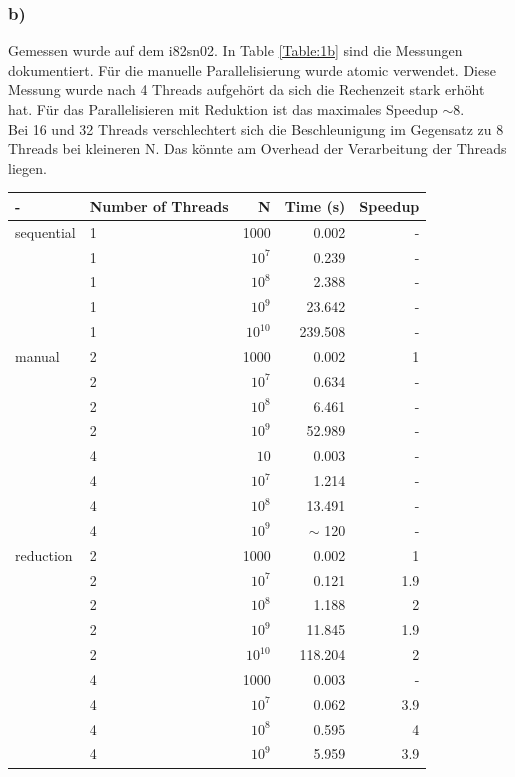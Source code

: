 \documentclass{report}
\begin{document}
        \subsubsection{b)}
        Gemessen wurde auf dem i82sn02. In Table \ref{Table:1b} sind die Messungen dokumentiert. Für die manuelle Parallelisierung wurde atomic verwendet. Diese Messung wurde nach 4 Threads aufgehört da sich die Rechenzeit stark erhöht hat. Für das Parallelisieren mit Reduktion ist das maximales Speedup $ \sim 8 $.\\
        Bei 16 und 32 Threads verschlechtert sich die Beschleunigung im Gegensatz zu 8 Threads bei kleineren N. Das könnte am Overhead der Verarbeitung der Threads liegen.
   \begin{table}     
	\begin{tabular}{|l|l|r|r|r|}
		\hline
		- & Number of Threads & N & Time (s) & Speedup \\
		\hline
		sequential & 1 & 1000 & 0.002 & - \\
		& 1 & $10^{7}$ & 0.239 & - \\
		& 1 & $10^{8}$ & 2.388 & - \\
		& 1 & $10^{9}$ & 23.642 & - \\
		& 1 & $10^{10}$ & 239.508 & - \\
		\hline
		manual & 2 & 1000 & 0.002 & 1 \\
		 & 2 & $10^{7}$ & 0.634 & - \\
		 & 2 & $10^{8}$ & 6.461 & - \\
		 & 2 & $10^{9}$ & 52.989 & - \\
		 & 4 & $10$ & 0.003 & - \\
		 & 4 & $10^{7}$ & 1.214 & - \\
		 & 4 & $10^{8}$ & 13.491 & - \\
		 & 4 & $10^{9}$ & $\sim$ 120 & - \\
		\hline
		reduction & 2 & 1000 & 0.002 & 1 \\
		 & 2 & $10^{7}$ & 0.121 & 1.9 \\
		 & 2 & $10^{8}$ & 1.188 & 2 \\
		 & 2 & $10^{9}$ & 11.845 & 1.9 \\
		 & 2 & $10^{10}$ & 118.204 & 2 \\
		 & 4 & 1000 & 0.003 & - \\
		 & 4 & $10^{7}$ & 0.062 & 3.9 \\
		 & 4 & $10^{8}$ & 0.595 & 4 \\
		 & 4 & $10^{9}$ & 5.959 & 3.9 \\

\end{tabular}
\end{table}
\end{document}
